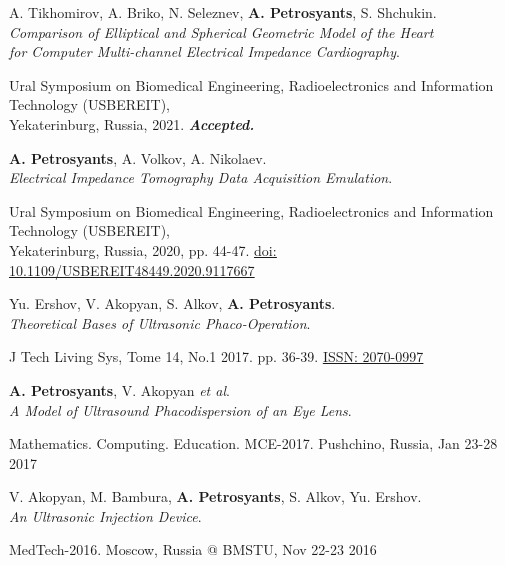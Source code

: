 \resumeSubHeadingListStart
\resumeProjectHeading
  {A. Tikhomirov, A. Briko, N. Seleznev, \textbf{A. Petrosyants}, S. Shchukin.\\
  \textit{Comparison of Elliptical and Spherical Geometric
  Model of the Heart}\\
  \textit{for Computer Multi-channel Electrical Impedance Cardiography}.}{}
      \begin{itemize}[leftmargin=0in, label={}]
        \small{\item{
          {Ural Symposium on Biomedical Engineering, Radioelectronics and Information Technology (USBEREIT), \\ 
          Yekaterinburg, Russia, 2021.}
          {\textbf{\textit{Accepted.}}}
        }}
      \end{itemize}

\resumeProjectHeading
    {\textbf{A. Petrosyants}, A. Volkov, A. Nikolaev.\\
  \textit{Electrical Impedance Tomography Data Acquisition Emulation}.}{}
      \begin{itemize}[leftmargin=0in, label={}]
      \small{\item{
        {Ural Symposium on Biomedical Engineering, Radioelectronics and Information Technology (USBEREIT), \\ 
              Yekaterinburg, Russia, 2020, pp. 44-47.}
        {\href{https://ieeexplore.ieee.org/abstract/document/9117667/}{\underline{doi: 10.1109/USBEREIT48449.2020.9117667}}}
      }}
      \end{itemize}

  \resumeProjectHeading
      {Yu. Ershov, V. Akopyan, S. Alkov, \textbf{A. Petrosyants}.\\
    \textit{Theoretical Bases of Ultrasonic Phaco-Operation}.}{}
        \begin{itemize}[leftmargin=0in, label={}]
        \small{\item{ 
          {J Tech Living Sys, Tome 14, No.1 2017. pp. 36-39. \href{https://www.elibrary.ru/item.asp?id=29715174}{\underline{ISSN: 2070-0997}}}
            }}
      \end{itemize}

  \resumeProjectHeading
    {\textbf{A. Petrosyants}, V. Akopyan \textit{et al}.\\
  \textit{A Model of Ultrasound Phacodispersion of an Eye Lens}.}{}
      \begin{itemize}[leftmargin=0in, label={}]
     \small{\item{ 
              {Mathematics. Computing. Education. MCE-2017. Pushchino, Russia, Jan 23-28 2017}
      }}
      \end{itemize}

  \resumeProjectHeading
      {V. Akopyan, M. Bambura, \textbf{A. Petrosyants}, S. Alkov, Yu. Ershov.\\
    \textit{An Ultrasonic Injection Device}.}{}
      \begin{itemize}[leftmargin=0in, label={}]
      \small{\item{ 
              {MedTech-2016. Moscow, Russia @ BMSTU,  Nov 22-23 2016}
      }}
      \end{itemize}
\resumeSubHeadingListEnd